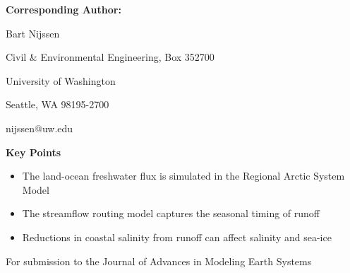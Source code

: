 \textbf{Corresponding Author: }

Bart Nijssen

Civil & Environmental Engineering, Box 352700

University of Washington

Seattle, WA 98195-2700

nijssen@uw.edu

\textbf{Key Points}
 
\begin{itemize}
\item The land-ocean freshwater flux is simulated in the Regional Arctic System Model
\item The streamflow routing model captures the seasonal timing of runoff
\item Reductions in coastal salinity from runoff can affect salinity and sea-ice
\end{itemize}
  
For submission to the Journal of Advances in Modeling Earth Systems
  
  